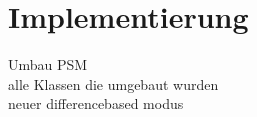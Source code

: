 \chapter{Implementierung}\label{ch:implementierung}

Umbau PSM\\
alle Klassen die umgebaut wurden\\
neuer differencebased modus \\



\begin{deprecated}
\cite{davis93}


\end{deprecated}
